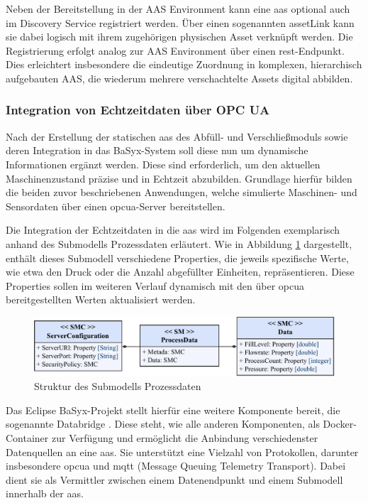 

Neben der Bereitstellung in der AAS Environment kann eine \acs{aas} optional auch im Discovery Service registriert werden.
Über einen sogenannten assetLink kann sie dabei logisch mit ihrem zugehörigen physischen Asset verknüpft werden.
Die Registrierung erfolgt analog zur AAS Environment über einen \acs{rest}-Endpunkt.
Dies erleichtert insbesondere die eindeutige Zuordnung in komplexen, hierarchisch aufgebauten AAS, die wiederum mehrere verschachtelte Assets digital abbilden.

\subsubsection{Integration von Echtzeitdaten über OPC UA}

Nach der Erstellung der statischen \acs{aas} des Abfüll- und Verschließmoduls sowie deren Integration in das BaSyx-System soll diese nun um dynamische Informationen ergänzt werden.
Diese sind erforderlich, um den aktuellen Maschinenzustand präzise und in Echtzeit abzubilden.
Grundlage hierfür bilden die beiden zuvor beschriebenen Anwendungen, welche simulierte Maschinen- und Sensordaten über einen \acs{opcua}-Server bereitstellen.

Die Integration der Echtzeitdaten in die \acs{aas} wird im Folgenden exemplarisch anhand des Submodells Prozessdaten erläutert.
Wie in Abbildung \ref{fig:SubmodellProzessdaten} dargestellt, enthält dieses Submodell verschiedene Properties, die jeweils spezifische Werte, wie etwa den Druck oder die Anzahl abgefüllter Einheiten, repräsentieren.
Diese Properties sollen im weiteren Verlauf dynamisch mit den über \acs{opcua} bereitgestellten Werten aktualisiert werden.

\begin{figure}[htbp]
    \centering
    \includegraphics[width=1\textwidth]{Bilder/OPCUA/ProcessData.pdf}
    \caption[Struktur des Submodells Prozessdaten]{Struktur des Submodells Prozessdaten}
    \label{fig:SubmodellProzessdaten}
\end{figure}
\vspace{-0.5em}

Das Eclipse BaSyx-Projekt stellt hierfür eine weitere Komponente bereit, die sogenannte Databridge \cite{BaSyxDatabridge}.
Diese steht, wie alle anderen Komponenten, als Docker-Container zur Verfügung und ermöglicht die Anbindung verschiedenster Datenquellen an eine \acs{aas}.
Sie unterstützt eine Vielzahl von Protokollen, darunter insbesondere \acs{opcua} und \acs{mqtt} (Message Queuing Telemetry Transport).
Dabei dient sie als Vermittler zwischen einem Datenendpunkt und einem Submodell innerhalb der \acs{aas}.

